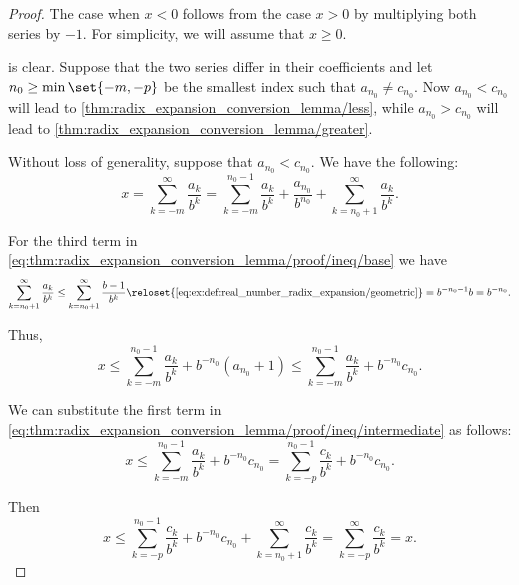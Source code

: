 \begin{proof}
  The case when \( x < 0 \) follows from the case \( x > 0 \) by multiplying both series by \( -1 \). For simplicity, we will assume that \( x \geq 0 \).

   is clear. Suppose that the two series differ in their coefficients and let \( n_0 \geq \min\set{ -m, -p } \) be the smallest index such that \( a_{n_0} \neq c_{n_0} \). Now \( a_{n_0} < c_{n_0} \) will lead to \cref{thm:radix_expansion_conversion_lemma/less}, while \( a_{n_0} > c_{n_0} \) will lead to \cref{thm:radix_expansion_conversion_lemma/greater}.

  Without loss of generality, suppose that \( a_{n_0} < c_{n_0} \). We have the following:
  \begin{equation}\label{eq:thm:radix_expansion_conversion_lemma/proof/ineq/base}
    x
    =
    \sum_{k=-m}^\infty \frac {a_k} {b^k}
    =
    \sum_{k=-m}^{n_0 - 1} \frac {a_k} {b^k} + \frac {a_{n_0}} {b^{n_0}} + \sum_{k=n_0+1}^\infty \frac {a_k} {b^k}.
  \end{equation}

  For the third term in \eqref{eq:thm:radix_expansion_conversion_lemma/proof/ineq/base} we have
  \begin{equation}\label{eq:thm:radix_expansion_conversion_lemma/proof/third_term}
    \sum_{k=n_0+1}^\infty \frac {a_k} {b^k}
    \leq
    \sum_{k=n_0+1}^\infty \frac {b - 1} {b^k}
    \reloset {\eqref{eq:ex:def:real_number_radix_expansion/geometric}} =
    b^{-n_0-1} b
    =
    b^{-n_0}.
  \end{equation}

  Thus,
  \begin{equation}\label{eq:thm:radix_expansion_conversion_lemma/proof/ineq/intermediate}
    x
    \leq
    \sum_{k=-m}^{n_0 - 1} \frac {a_k} {b^k} + b^{-n_0} (a_{n_0} + 1)
    \leq
    \sum_{k=-m}^{n_0 - 1} \frac {a_k} {b^k} + b^{-n_0} c_{n_0}.
  \end{equation}

  We can substitute the first term in \eqref{eq:thm:radix_expansion_conversion_lemma/proof/ineq/intermediate} as follows:
  \begin{equation*}
    x
    \leq
    \sum_{k=-m}^{n_0 - 1} \frac {a_k} {b^k} + b^{-n_0} c_{n_0}
    =
    \sum_{k=-p}^{n_0 - 1} \frac {c_k} {b^k} + b^{-n_0} c_{n_0}.
  \end{equation*}

  Then
  \begin{equation}\label{eq:thm:radix_expansion_conversion_lemma/proof/ineq/final}
    x
    \leq
    \sum_{k=-p}^{n_0 - 1} \frac {c_k} {b^k} + b^{-n_0} c_{n_0} + \sum_{k=n_0+1}^\infty \frac {c_k} {b^k}
    =
    \sum_{k=-p}^\infty \frac {c_k} {b^k}
    =
    x.
  \end{equation}


\end{proof}
